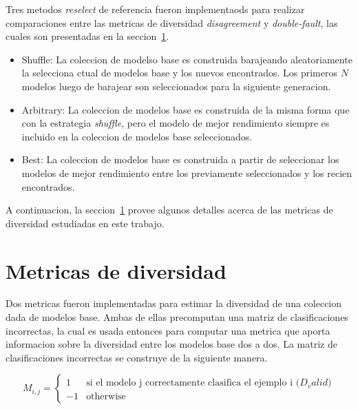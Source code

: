 \begin{equation}
\label{code:reselect}
\end{equation}

Tres metodos \textit{reselect} de referencia fueron implementaods para realizar comparaciones entre las metricas de diversidad \textit{disagreement} y \textit{double-fault}, las cuales son presentadas en la seccion~\ref{section:diversity-meassures}.
\begin{itemize}
    \item Shuffle: La coleccion de modelso base es construida barajeando aleatoriamente la selecciona ctual de modelos base y los nuevos encontrados. Los primeros $N$ modelos luego de barajear son seleccionados para la siguiente generacion.
    \item Arbitrary: La coleccion de modelos base es construida de la misma forma que con la estrategia \textit{shuffle}, pero el modelo de mejor rendimiento siempre es incluido en la coleccion de modelos base seleccionados.
    \item Best: La coleccion de modelos base es construida a partir de seleccionar los modelos de mejor rendimiento entre los previamente seleccionados y los recien encontrados.
\end{itemize}

A continuacion, la seccion~\ref{section:diversity-meassures} provee algunos detalles acerca de las metricas de diversidad estudiadas en este trabajo.

\section{Metricas de diversidad}\label{section:diversity-meassures}

Dos metricas fueron implementadas para estimar la diversidad de una coleccion dada de modelos base. Ambas de ellas precomputan una matriz de clasificaciones incorrectas, la cual es usada entonces para computar una metrica que aporta informacion sobre la diversidad entre los modelos base dos a dos. La matriz de clasificaciones incorrectas se construye de la siguiente manera.

\begin{equation}
    M_{i,j} =
    \begin{cases}
        1 & \text{si el modelo j correctamente clasifica el ejemplo i ($D_valid$)} \\
        -1 & \text{otherwise}
    \end{cases}
\end{equation}

